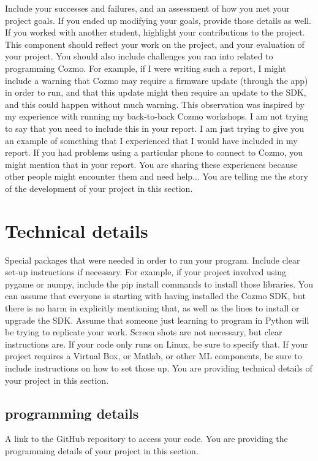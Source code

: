\documentclass[12pt,a4paper]{article}
\begin{document}
  Include your successes and failures, and an assessment of how you met your project goals.  If you ended up modifying your goals, provide those details as well.  If you worked with another student, highlight your contributions to the project.  This component should reflect your work on the project, and your evaluation of your project.  You should also include challenges you ran into related to programming Cozmo.  For example, if I were writing such a report, I might include a warning that Cozmo may require a firmware update (through the app) in order to run, and that this update might then require an update to the SDK, and this could happen without much warning.  This observation was inspired by my experience with running my back-to-back Cozmo workshops.  I am not trying to say that you need to include this in your report.  I am just trying to give you an example of something that I experienced that I would have included in my report.  If you had problems using a particular phone to connect to Cozmo, you might mention that in your report.  You are sharing these experiences because other people might encounter them and need help...  You are telling me the story of the development of your project in this section.

\section{Technical details}
Special packages that were needed in order to run your program.  Include clear set-up instructions if necessary.  For example, if your project involved using pygame or numpy, include the pip install commands to install those libraries.  You can assume that everyone is starting with having installed the Cozmo SDK, but there is no harm in explicitly mentioning that, as well as the lines to install or upgrade the SDK.  Assume that someone just learning to program in Python will be trying to replicate your work.  Screen shots are not necessary, but clear instructions are.  If your code only runs on Linux, be sure to specify that.  If your project requires a Virtual Box, or Matlab, or other ML components, be sure to include instructions on how to set those up.  You are providing technical details of your project in this section.

\subsection{programming details}

A link to the GitHub repository to access your code.  You are providing the programming details of your project in this section.
\end{document}
